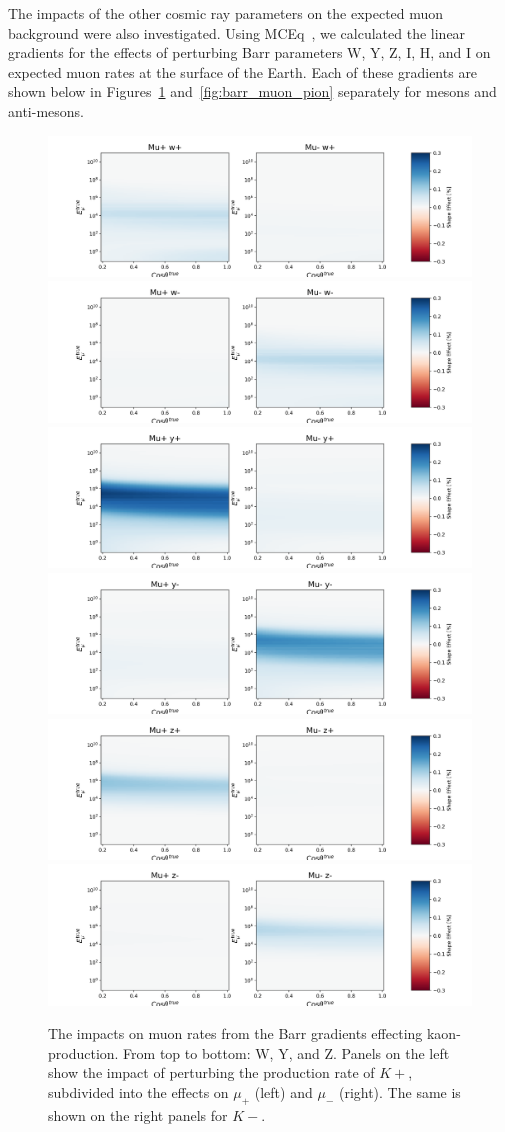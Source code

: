 \documentclass[main.tex]{subfiles}
\begin{document}
The impacts of the other cosmic ray parameters on the expected muon background were also investigated. 
Using MCEq~\cite{fedynitch2015calculation}, we calculated the linear gradients for the effects of perturbing Barr parameters W, Y, Z, I, H, and I on expected muon rates at the surface of the Earth. 
Each of these gradients are shown below in Figures~\ref{fig:barr_muon_kaon} and~\ref{fig:barr_muon_pion} separately for mesons and anti-mesons.

\begin{figure}
    \centering
    \includegraphics[width=0.45\linewidth]{./figures/muon/muon_barr_w+.png}%
    \includegraphics[width=0.45\linewidth]{./figures/muon/muon_barr_w-.png}
    \includegraphics[width=0.45\linewidth]{./figures/muon/muon_barr_y+.png}%
    \includegraphics[width=0.45\linewidth]{./figures/muon/muon_barr_y-.png}
    \includegraphics[width=0.45\linewidth]{./figures/muon/muon_barr_z+.png}%
    \includegraphics[width=0.45\linewidth]{./figures/muon/muon_barr_z-.png}
    \caption{The impacts on muon rates from the Barr gradients effecting kaon-production. From top to bottom: W, Y, and Z. Panels on the left show the impact of perturbing the production rate of $K+$, subdivided into the effects on $\mu_{+}$ (left) and $\mu_{-}$ (right). The same is shown on the right panels for $K-$.}
    \label{fig:barr_muon_kaon}
\end{figure}
\end{document}
